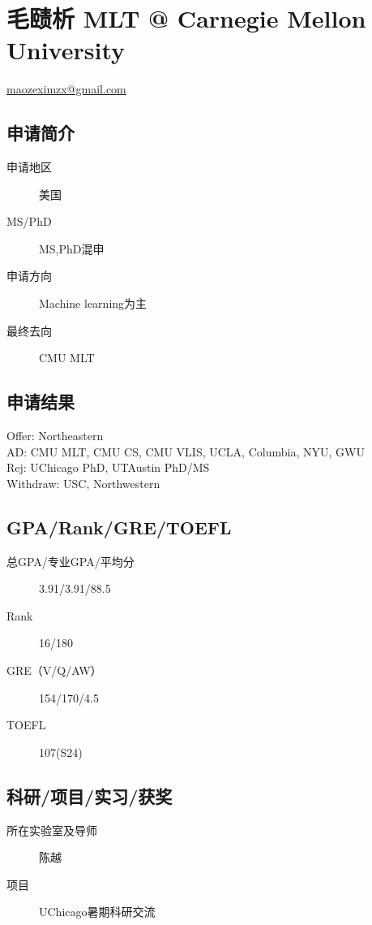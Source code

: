 \documentclass[11pt,fleqn,openany]{book} %
\begin{document}
\section{毛赜析 MLT @ Carnegie Mellon University}
\hfill \href{mailto:maozeximzx@gmail.com}{maozeximzx@gmail.com}

\noindent\begin{minipage}[t]{0.45\textwidth}
\subsection*{申请简介}
\begin{description}
\item[申请地区] 美国
\item[MS/PhD] MS,PhD混申
\item[申请方向] Machine learning为主
\item[最终去向] CMU MLT
\end{description}
\end{minipage}
\hfill
\begin{minipage}[t]{0.45\textwidth}
\subsection*{申请结果}
\noindent Offer: Northeastern\\
AD: CMU MLT, CMU CS, CMU VLIS, UCLA, Columbia, NYU, GWU\\
Rej: UChicago PhD, UTAustin PhD/MS\\
Withdraw: USC, Northwestern
\end{minipage}
\subsection*{GPA/Rank/GRE/TOEFL}
\begin{description}
\item[总GPA/专业GPA/平均分] 3.91/3.91/88.5
\item[Rank] 16/180
\item[GRE（V/Q/AW）] 154/170/4.5
\item[TOEFL] 107(S24)
\end{description}

\subsection*{科研/项目/实习/获奖}
\begin{description}
\item[所在实验室及导师] 陈越
\item[项目] UChicago暑期科研交流
\end{description}
\clearpage
\end{document}
